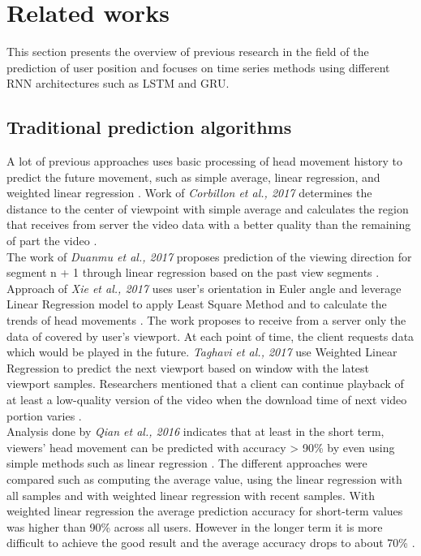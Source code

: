 \section{Related works}
\label{sec:related}
This section presents the overview of previous research in the field of the prediction of user position and focuses on time series methods using different RNN architectures such as LSTM and GRU.  


\subsection{Traditional prediction algorithms}
\label{sec:related:timeseries}
A lot of previous approaches uses basic processing of head movement history to predict the future movement, such as simple average, linear regression, and weighted linear regression \cite{attention_saliency}. Work of \textit{Corbillon et al., 2017} determines the distance to the center of viewpoint with simple average and calculates the region that receives from server the video data with a better quality than the remaining of part the video \cite{simple_average}.\\ The work of \textit{Duanmu et al., 2017} proposes prediction of the viewing direction for segment n + 1 through linear regression based on the past view segments \cite{linreg1}. Approach of \textit{Xie et al., 2017} uses user’s orientation in Euler angle and leverage Linear Regression model to apply Least Square Method and to calculate the trends of head movements \cite{linreg2}. The work \cite{linreg3} proposes to receive from a server only the data of covered by user's viewport. At each point of time, the client requests data which would be played in the future. \textit{Taghavi et al., 2017} use Weighted Linear Regression to predict the next viewport based on window with the latest viewport samples. Researchers mentioned that a client can continue playback of at least a low-quality version of the video when the download time of next video portion varies \cite{linreg3}.\\
Analysis done by \textit{Qian et al., 2016} indicates that at least in the short term, viewers’ head movement can be predicted with accuracy > 90\% by even using simple methods such as linear regression \cite{cellular_opt}. The different approaches were compared such as computing the average value, using the linear regression with all samples and with weighted linear regression with recent samples. With weighted linear regression the average prediction accuracy for short-term values was higher than 90\% across all users. However in the longer term it is more difficult to achieve the good result and the average accuracy drops to about 70\% \cite{cellular_opt}.\\
